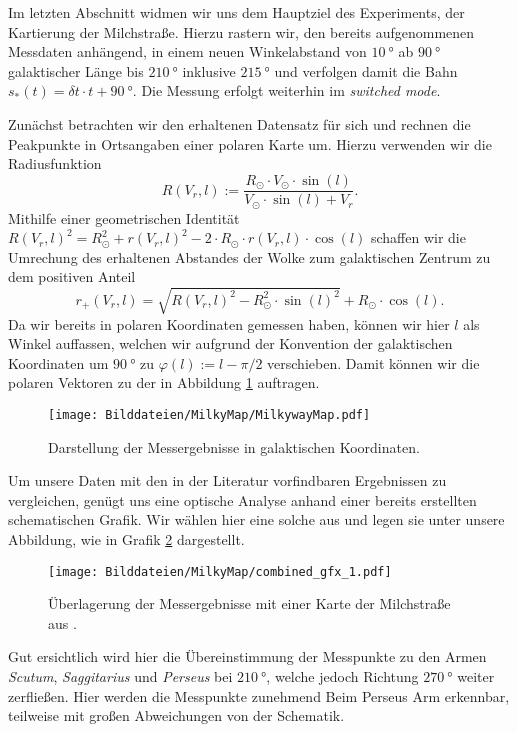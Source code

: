 \documentclass[../../main.tex]{subfiles}
\begin{document}
    Im letzten Abschnitt widmen wir uns dem Hauptziel des Experiments, der Kartierung der Milchstraße. Hierzu rastern wir, den bereits aufgenommenen Messdaten anhängend, in einem neuen Winkelabstand von $\SI{10}{\degree}$ ab $\SI{90}{\degree}$ galaktischer Länge bis $\SI{210}{\degree}$ inklusive $\SI{215}{\degree}$ und verfolgen damit die Bahn $s_*(t) = \delta t\cdot t + \SI{90}{\degree}$. Die Messung erfolgt weiterhin im \emph{switched mode}.
    
    Zunächst betrachten wir den erhaltenen Datensatz für sich und rechnen die Peakpunkte in Ortsangaben einer polaren Karte um. Hierzu verwenden wir die Radiusfunktion 
    \[
        R(V_r,l):= \frac{R_\odot\cdot V_\odot\cdot\sin(l)}{V_\odot\cdot\sin(l) + V_r}.
    \]
    Mithilfe einer geometrischen Identität $R(V_r,l)^2 = R_\odot^2 + r(V_r,l)^2 - 2\cdot R_\odot\cdot r(V_r,l)\cdot\cos(l)$ schaffen wir die Umrechung des erhaltenen Abstandes der Wolke zum galaktischen Zentrum zu dem positiven Anteil
    \[
        r_+(V_r,l) = \sqrt{R(V_r,l)^2 - R_\odot^2\cdot\sin(l)^2} + R_\odot\cdot\cos(l). 
    \]
    Da wir bereits in polaren Koordinaten gemessen haben, können wir hier $l$ als Winkel auffassen, welchen wir aufgrund der Konvention der galaktischen Koordinaten um $\SI{90}{\degree}$ zu $\varphi(l) := l - \pi/2$ verschieben. Damit können wir die polaren Vektoren zu der in Abbildung \ref{fig:GalaktischeMilchStrasse} auftragen.
    \begin{figure}[H]
        \centering
        \texttt{[image: Bilddateien/MilkyMap/MilkywayMap.pdf]}
        \caption{Darstellung der Messergebnisse in galaktischen Koordinaten.}
        \label{fig:GalaktischeMilchStrasse}
    \end{figure}
    Um unsere Daten mit den in der Literatur vorfindbaren Ergebnissen zu vergleichen, genügt uns eine optische Analyse anhand einer bereits erstellten schematischen Grafik. Wir wählen hier eine solche aus \cite{doi:10.1126/science.1120914} und legen sie unter unsere Abbildung, wie in Grafik \ref{fig:combinedMilkyWay} dargestellt.
    \begin{figure}[H]
        \centering
        \texttt{[image: Bilddateien/MilkyMap/combined\_gfx\_1.pdf]}
        \caption{Überlagerung der Messergebnisse mit einer Karte der Milchstraße aus \cite{doi:10.1126/science.1120914}.}
        \label{fig:combinedMilkyWay}
    \end{figure}
    Gut ersichtlich wird hier die Übereinstimmung der Messpunkte zu den Armen \emph{Scutum}, \emph{Saggitarius} und \emph{Perseus} bei $\SI{210}{\degree}$, welche jedoch Richtung $\SI{270}{\degree}$ weiter zerfließen. Hier werden die Messpunkte zunehmend Beim Perseus Arm erkennbar, teilweise mit großen Abweichungen von der Schematik. 
    
\end{document}
